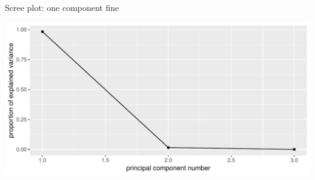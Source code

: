 \begin{frame}[fragile]{Scree plot: one component fine}

\begin{knitrout}
\color{fgcolor}\begin{kframe}
\begin{alltt}
\hlstd{=}\hlstd{)}
\end{alltt}
\end{kframe}
\includegraphics[width=\maxwidth]{figure/palermo-1} 

\end{knitrout}

  
\end{frame}

